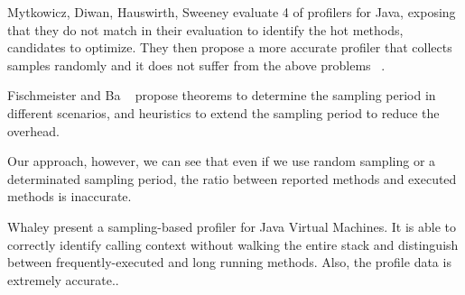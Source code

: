 \documentclass{sig-alternate}
\newcommand{\ab}[1]{\nb{Alexandre}{blue}{#1}}
\newcommand{\vp}[1]{\nb{Vanessa}{orange}{#1}}
\begin{document}



Mytkowicz, Diwan, Hauswirth, Sweeney evaluate 4 of profilers for Java, exposing that they do not match in their evaluation to identify the hot methods, candidates to optimize. They then propose a more accurate profiler that collects samples randomly and it does not suffer from the above problems ~\cite{Mytk10a}. 

Fischmeister and Ba ~\cite{Fischmeister:2010:SPE:1755888.1755908} propose theorems to determine the sampling period in different scenarios, and heuristics to extend the sampling period to reduce the overhead.

Our approach, however, we can see that even if we use random sampling or a determinated sampling period, the ratio between reported methods and executed methods is inaccurate.



Whaley present a sampling-based profiler for Java Virtual Machines. It is able to correctly identify calling context without walking the entire stack and distinguish between frequently-executed and long running methods. Also, the profile data is extremely accurate.\cite{Whaley:2000:PSP:337449.337483}. 
\end{document}
